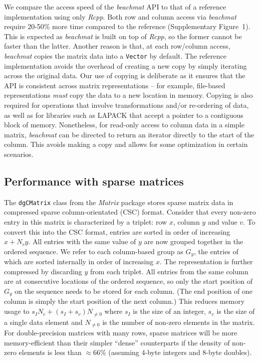 \documentclass[10pt,letterpaper]{article}
\newcommand{\beachmat}{\textit{beachmat}}
\newcommand{\code}[1]{\texttt{#1}}
\newcommand{\suppfigsimpleaccess}{1}
\begin{document}

We compare the access speed of the \beachmat{} API to that of a reference implementation using only \textit{Rcpp}.
Both row and column access via \beachmat{} require 20-50\% more time compared to the reference (Supplementary Figure~\suppfigsimpleaccess{}).
This is expected as \beachmat{} is built on top of \textit{Rcpp}, so the former cannot be faster than the latter.
Another reason is that, at each row/column access, \beachmat{} copies the matrix data into a \code{Vector} by default.
The reference implementation avoids the overhead of creating a new copy by simply iterating across the original data.
Our use of copying is deliberate as it ensures that the API is consistent across matrix representations -- for example, file-based representations \textit{must} copy the data to a new location in memory.
Copying is also required for operations that involve transformations and/or re-ordering of data, as well as for libraries such as LAPACK that accept a pointer to a contiguous block of memory.
Nonetheless, for read-only access to column data in a simple matrix, \beachmat{} can be directed to return an iterator directly to the start of the column.
This avoids making a copy and allows for some optimization in certain scenarios.

\subsection*{Performance with sparse matrices}
The \code{dgCMatrix} class from the \textit{Matrix} package stores sparse matrix data in compressed sparse column-orientated (CSC) format.
Consider that every non-zero entry in this matrix is characterized by a triplet: row $x$, column $y$ and value $v$.
To convert this into the CSC format, entries are sorted in order of increasing $x + N_ry$.
All entries with the same value of $y$ are now grouped together in the ordered sequence.
We refer to each column-based group as $G_y$, the entries of which are sorted internally in order of increasing $x$.
The representation is further compressed by discarding $y$ from each triplet.
All entries from the same column are at consecutive locations of the ordered sequence, so only the start position of $G_y$ on the sequence needs to be stored for each column.
(The end position of one column is simply the start position of the next column.)
This reduces memory usage to $s_IN_c + (s_I + s_v) N_{\ne 0}$ where $s_I$ is the size of an integer, $s_v$ is the size of a single data element and $N_{\ne 0}$ is the number of non-zero elements in the matrix.
For double-precision matrices with many rows, sparse matrices will be more memory-efficient than their simpler ``dense'' counterparts if the density of non-zero elements is less than $\approx66$\% (assuming 4-byte integers and 8-byte doubles). 
\end{document}
